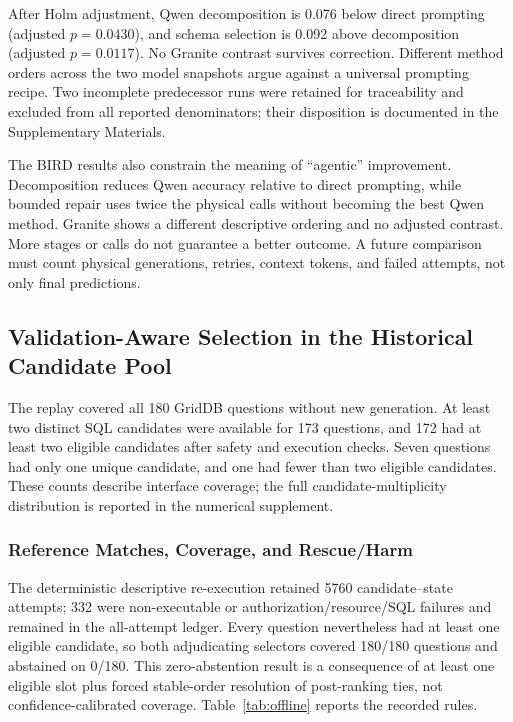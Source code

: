 \documentclass[applsci,article,submit,moreauthors]{Definitions/mdpi}
\begin{document}
After Holm adjustment, Qwen decomposition is 0.076 below direct prompting (adjusted $p=0.0430$), and schema selection is 0.092 above decomposition (adjusted $p=0.0117$). No Granite contrast survives correction. Different method orders across the two model snapshots argue against a universal prompting recipe. Two incomplete predecessor runs were retained for traceability and excluded from all reported denominators; their disposition is documented in the Supplementary Materials.

The BIRD results also constrain the meaning of ``agentic'' improvement. Decomposition reduces Qwen accuracy relative to direct prompting, while bounded repair uses twice the physical calls without becoming the best Qwen method. Granite shows a different descriptive ordering and no adjusted contrast. More stages or calls do not guarantee a better outcome. A future comparison must count physical generations, retries, context tokens, and failed attempts, not only final predictions.

\subsection{Validation-Aware Selection in the Historical Candidate Pool}

The replay covered all 180 GridDB questions without new generation. At least two distinct SQL candidates were available for 173 questions, and 172 had at least two eligible candidates after safety and execution checks. Seven questions had only one unique candidate, and one had fewer than two eligible candidates. These counts describe interface coverage; the full candidate-multiplicity distribution is reported in the numerical supplement.

\subsubsection{Reference Matches, Coverage, and Rescue/Harm}

The deterministic descriptive re-execution retained 5760 candidate--state attempts; 332 were non-executable or authorization/resource/SQL failures and remained in the all-attempt ledger. Every question nevertheless had at least one eligible candidate, so both adjudicating selectors covered 180/180 questions and abstained on 0/180. This zero-abstention result is a consequence of at least one eligible slot plus forced stable-order resolution of post-ranking ties, not confidence-calibrated coverage. Table~\ref{tab:offline} reports the recorded rules.
\end{document}
